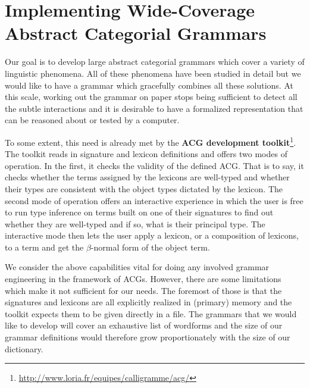 \chapter{Implementing Wide-Coverage Abstract Categorial Grammars}
\label{chap:implementation}

Our goal is to develop large abstract categorial grammars which cover a
variety of linguistic phenomena. All of these phenomena have been
studied in detail but we would like to have a grammar which gracefully
combines all these solutions. At this scale, working out the grammar on
paper stops being sufficient to detect all the subtle interactions and
it is desirable to have a formalized representation that can be reasoned
about or tested by a computer.

To some extent, this need is already met by the \textbf{ACG development
  toolkit}\footnote{\url{http://www.loria.fr/equipes/calligramme/acg/}}. The
toolkit reads in signature and lexicon definitions and offers two modes
of operation. In the first, it checks the validity of the defined
ACG. That is to say, it checks whether the terms assigned by the
lexicons are well-typed and whether their types are consistent with the
object types dictated by the lexicon. The second mode of operation
offers an interactive experience in which the user is free to run type
inference on terms built on one of their signatures to find out whether
they are well-typed and if so, what is their principal type. The
interactive mode then lets the user apply a lexicon, or a composition of
lexicons, to a term and get the $\beta$-normal form of the object term.

We consider the above capabilities vital for doing any involved grammar
engineering in the framework of ACGs. However, there are some
limitations which make it not sufficient for our needs. The foremost of
those is that the signatures and lexicons are all explicitly realized in
(primary) memory and the toolkit expects them to be given directly in a
file. The grammars that we would like to develop will cover an
exhaustive list of wordforms and the size of our grammar definitions
would therefore grow proportionately with the size of our dictionary.

